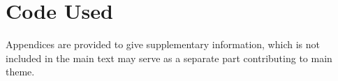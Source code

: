 \chapter{Code Used} 
Appendices are provided to give supplementary information, which is not included in the main text may serve as a separate part contributing to main theme.  
